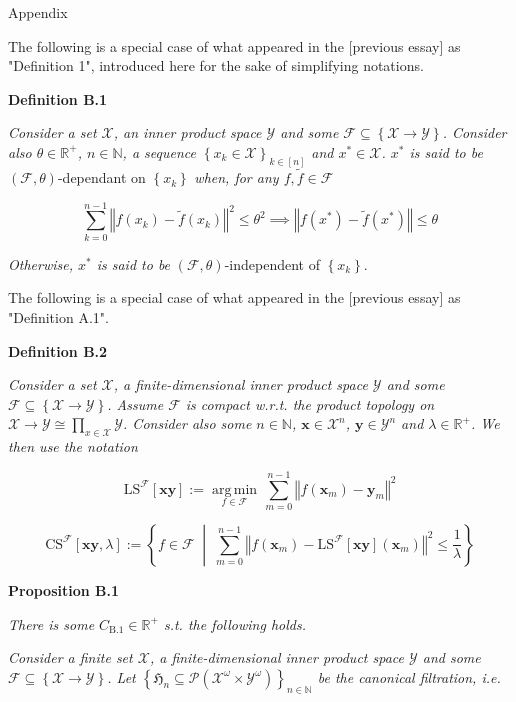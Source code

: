 \documentclass[a4paper]{article}
\newcommand{\Co}[1]{}
\newcommand{\San}[1]{}
\newcommand{\AP}[1]{\left(#1\right)}
\newcommand{\AC}[1]{\left\{#1\right\}}
\newcommand{\ACM}[2]{\left\{#1\;\middle\vert\;#2\right\}}
\newcommand{\Norm}[1]{\left\Vert #1 \right\Vert}
\newcommand{\Argmin}[1]{\underset{#1}{\operatorname{arg\,min}}\,}
\newcommand{\Nats}{\mathbb{N}}
\newcommand{\Reals}{\mathbb{R}}
\newcommand{\PS}[1]{\mathcal{P}\AP{#1}} %
\newcommand{\X}{\mathcal{X}}
\newcommand{\Y}{\mathcal{Y}}
\newcommand{\F}{\mathcal{F}}
\newcommand{\LS}{\mathrm{LS}}
\newcommand{\CS}{\mathrm{CS}}
\begin{document}
\begin{Huge}Appendix\end{Huge}

The following is a special case of what appeared in the [previous essay]\San{(https://www.alignmentforum.org/posts/Qa5jG9z9dC6E4s9JH/dimensional-regret-without-resets)} as "Definition 1", introduced here for the sake of simplifying notations.

\textbf{Definition B.1}\Co{b}

\textit{Consider a set $\X$, an inner product space $\Y$ and some $\F\subseteq\AC{\X\rightarrow\Y}$. Consider also $\theta\in \Reals^+$, $n\in\Nats$, a sequence $\AC{x_k\in\X}_{k\in[n]}$ and $x^*\in\X$. $x^*$ is said to be} $\AP{\F,\theta}$-dependant on $\AC{x_k}$ \textit{when, for any $f,\tilde{f}\in\F$}\Co{i}

$$\sum_{k=0}^{n-1}\Norm{f\AP{x_k}-\tilde{f}\AP{x_k}}^{2}\leq\theta^2\implies \Norm{f\AP{x^*}-\tilde{f}\AP{x^*}}\leq\theta$$

\textit{Otherwise, $x^*$ is said to be}\Co{i} $\AP{\F,\theta}$-independent of $\AC{x_k}$.

The following is a special case of what appeared in the [previous essay]\San{(https://www.alignmentforum.org/posts/Qa5jG9z9dC6E4s9JH/dimensional-regret-without-resets)} as "Definition A.1".

\textbf{Definition B.2}\Co{b}

\textit{Consider a set $\X$, a finite-dimensional inner product space $\Y$ and some $\F\subseteq\AC{\X\rightarrow\Y}$. Assume $\F$ is compact w.r.t. the product topology on $\X\rightarrow\Y\cong\prod_{x\in\X}\Y$. Consider also some $n\in\Nats$, $\boldsymbol{x}\in\X^n$, $\boldsymbol{y}\in\Y^n$ and $\lambda\in\Reals^+$. We then use the notation}\Co{i}

$$\LS^{\F}[\boldsymbol{xy}]:=\Argmin{f\in\F}{\sum_{m=0}^{n-1}\Norm{f\AP{\boldsymbol{x}_m}-\boldsymbol{y}_m }^{2}}$$

$$\CS^{\F}[\boldsymbol{xy},\lambda]:=\ACM{f\in\F}{\sum_{m=0}^{n-1}\Norm{f\AP{\boldsymbol{x}_m}-\LS^\F[\boldsymbol{xy}]\AP{\boldsymbol{x}_m}}^{2}\leq \frac{1}{\lambda}}$$

\textbf{Proposition B.1}\Co{b}

\textit{There is some $C_{\mathrm{B.1}}\in\Reals^+$ s.t. the following holds.}\Co{i}

\textit{Consider a finite set $\X$, a finite-dimensional inner product space $\Y$ and some $\F\subseteq\AC{\X\rightarrow\Y}$. Let $\AC{\mathfrak{H}_n\subseteq\PS{\X^\omega\times\Y^\omega}}_{n\in\Nats}$ be the canonical filtration, i.e.}\Co{i}
\end{document}
